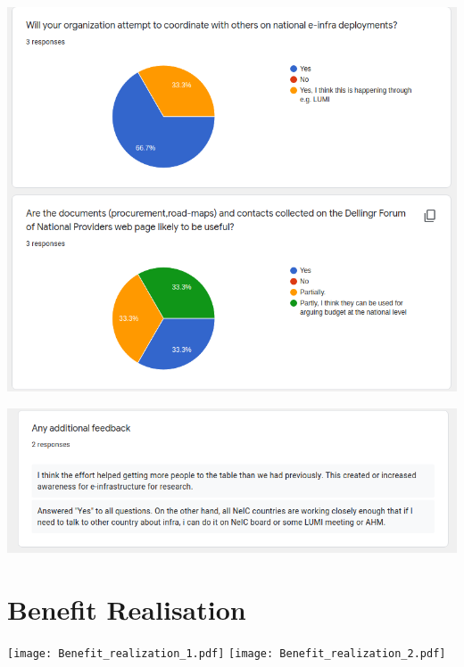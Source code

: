 \documentclass{article}
\begin{document}
\begin{appendices}
\begin{center}
\includegraphics[scale=0.6]{hlt_responses_2.png}
\end{center}

\begin{center}
\includegraphics[scale=0.6]{hlt_responses_3.png}
\end{center}

\newpage
\section{Benefit Realisation}
\label{app:benefit}
\begin{center}
\texttt{[image: Benefit\_realization\_1.pdf]}
\texttt{[image: Benefit\_realization\_2.pdf]}
\end{center}

\newpage

\end{appendices}
\end{document}
